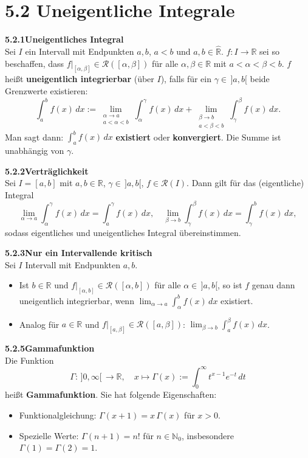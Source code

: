 \documentclass[a4paper,12pt]{article}
\newcommand{\gentry}[3]{%
  \noindent\textbf{#1\quad #2}\nopagebreak\\[0.2em]
  #3\par\smallskip
}
\begin{document}
\section*{5.2 \quad Uneigentliche Integrale}

\gentry{5.2.1}{Uneigentliches Integral}{%
  Sei $I$ ein Intervall mit Endpunkten $a, b$, $a<b$ und $a,b \in \widehat{\mathbb{R}}$.
  $f: I \to \mathbb{R}$ sei so beschaffen, dass $f|_{[\alpha,\beta]} \in \mathcal{R}([\alpha,\beta])$
  für alle $\alpha, \beta \in \mathbb{R}$ mit $a<\alpha<\beta<b$.
  $f$ heißt \textbf{uneigentlich integrierbar} (über $I$), falls für ein
  $\gamma \in\,]a,b[$ beide Grenzwerte existieren:
  \[
    \int_a^b f(x)\,dx := \lim_{\substack{\alpha \to a\\ a<\alpha<b}}\int_\alpha^\gamma f(x)\,dx
    + \lim_{\substack{\beta \to b\\ a<\beta<b}}\int_\gamma^\beta f(x)\,dx.
  \]
  Man sagt dann: $\int_a^b f(x)\,dx$ \textbf{existiert} oder \textbf{konvergiert}.
  Die Summe ist unabhängig von $\gamma$.
}

\gentry{5.2.2}{Verträglichkeit}{%
  Sei $I=[a,b]$ mit $a,b\in\mathbb{R}$, $\gamma \in\,]a,b[$, $f \in \mathcal{R}(I)$.
  Dann gilt für das (eigentliche) Integral
  \[
    \lim_{\alpha \to a} \int_\alpha^\gamma f(x)\,dx = \int_a^\gamma f(x)\,dx,
    \quad \lim_{\beta \to b} \int_\gamma^\beta f(x)\,dx = \int_\gamma^b f(x)\,dx,
  \]
  sodass eigentliches und uneigentliches Integral übereinstimmen.
}

\gentry{5.2.3}{Nur ein Intervallende kritisch}{%
  Sei $I$ Intervall mit Endpunkten $a, b$.
  \begin{itemize}[topsep=2pt,itemsep=1pt]
    \item[(i)] Ist $b \in \mathbb{R}$ und $f|_{[\alpha, b]} \in \mathcal{R}([\alpha,b])$
      für alle $\alpha \in\,]a,b[$, so ist $f$ genau dann uneigentlich
      integrierbar, wenn $\lim_{\alpha \to a} \int_\alpha^b f(x)\,dx$ existiert.
    \item[(ii)] Analog für $a \in \mathbb{R}$ und $f|_{[a,\beta]} \in \mathcal{R}([a,\beta])$:
      $\lim_{\beta \to b} \int_a^\beta f(x)\,dx$.
  \end{itemize}
}

\gentry{5.2.5}{Gammafunktion}{%
  Die Funktion
  \[
    \Gamma: \,]0,\infty[\, \to \mathbb{R}, \quad
    x \mapsto \Gamma(x) := \int_0^\infty t^{x-1} e^{-t}\,dt
  \]
  heißt \textbf{Gammafunktion}. Sie hat folgende Eigenschaften:
  \begin{itemize}[topsep=2pt,itemsep=1pt]
    \item Funktionalgleichung: $\Gamma(x+1) = x\,\Gamma(x)$ für $x>0$.
    \item Spezielle Werte: $\Gamma(n+1) = n!$ für $n \in \mathbb{N}_0$, insbesondere $\Gamma(1) = \Gamma(2) = 1$.
  \end{itemize}
}
\end{document}
